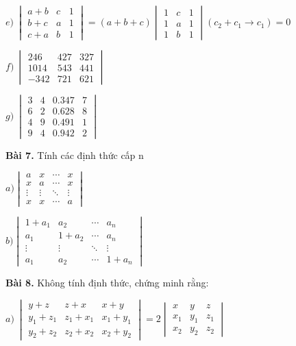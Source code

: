 \documentclass[12pt]{report}
\begin{document}
$e)\ \begin{vmatrix} a+b & c & 1 \\ b+c & a & 1 \\ c+a & b & 1 \end{vmatrix} = (a + b + c)\begin{vmatrix} 1 & c & 1 \\ 1 & a & 1 \\ 1 & b & 1 \end{vmatrix}(c_2 + c_1 \to c_1) = 0$

$f)\ \begin{vmatrix} 246 & 427 & 327 \\ 1014 & 543 & 441 \\ -342 & 721 & 621 \end{vmatrix}$

$g)\ \begin{vmatrix} 3 & 4 & 0.347 & 7 \\ 6 & 2 & 0.628 & 8 \\ 4 & 9 & 0.491 & 1 \\ 9 & 4 & 0.942 & 2 \end{vmatrix}$

\textbf{Bài 7.} Tính các định thức cấp n

$a) \begin{vmatrix} 
	a & x & \cdots & x \\ 
	x & a & \cdots & x \\ 
	\vdots & \vdots & \ddots & \vdots \\
	x & x & \cdots & a
\end{vmatrix}$

$b) \begin{vmatrix} 
	1 + a_1 & a_2 & \cdots & a_n \\ 
	a_1 & 1 + a_2 & \cdots & a_n \\ 
	\vdots & \vdots & \ddots & \vdots \\
	a_1 & a_2 & \cdots & 1+a_n
\end{vmatrix}$

\textbf{Bài 8.} Không tính định thức, chứng minh rằng:

$a)\ \begin{vmatrix}
	y+z & z+x & x+y \\
	y_1+z_1 & z_1+x_1 & x_1+y_1 \\
	y_2+z_2 & z_2+x_2 & x_2+y_2
\end{vmatrix}
= 2\begin{vmatrix}
	x & y & z \\
	x_1 & y_1 & z_1 \\
	x_2 & y_2 & z_2
\end{vmatrix}$
\end{document}
